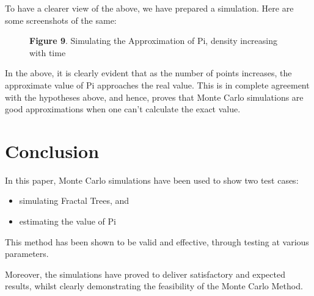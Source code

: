 \documentclass{resonance}
\begin{document}
To have a clearer view of the above, we have prepared a simulation. Here are some screenshots of the same:

\begin{figure}[h!]
	\hskip 0.7cm
    \vspace{20pt}
    \fbox{\texttt{[image: pi\_ss\_1]}}
    \fbox{\texttt{[image: pi\_ss\_2]}}
    \fbox{\texttt{[image: pi\_ss\_3]}}
    
    \vspace{-10pt}
    \hspace{30pt}\scriptsize{\textbf{Figure 9}. \normalfont Simulating the Approximation of Pi, density increasing with time}\\
\end{figure}
In the above, it is clearly evident that as the number of points increases, the approximate value of Pi approaches the real value. This is in complete agreement with the hypotheses above, and hence, proves that Monte Carlo simulations are good approximations when one can’t calculate the exact value.

\section{Conclusion}
In this paper, Monte Carlo simulations have been used to show two test cases:
\begin{itemize}
\item simulating Fractal Trees, and
\item estimating the value of Pi
\end{itemize}

This method has been shown to be valid and effective, through testing at various parameters.

Moreover, the simulations have proved to deliver satisfactory and expected results, whilst clearly demonstrating the feasibility of the Monte Carlo Method.\\\\\\\\\\\\\\\\
\end{document}
